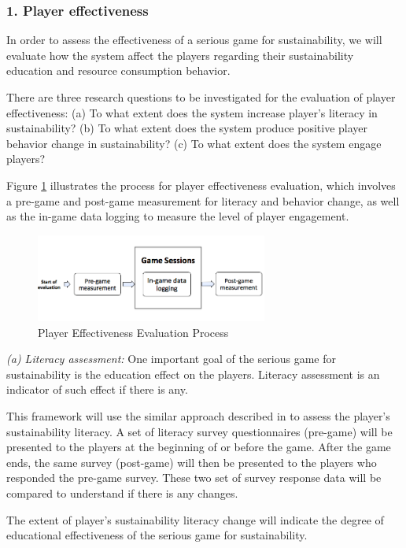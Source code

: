 \documentclass{sigchi}
\begin{document}
\subsubsection{1. Player effectiveness}
In order to assess the effectiveness of a serious game for sustainability, we will evaluate how the system affect the players regarding their sustainability education and resource consumption behavior.

There are three research questions to be investigated for the evaluation of player effectiveness: (a) To what extent does the system increase player's literacy in sustainability? (b) To what extent does the system produce positive player behavior change in sustainability? (c) To what extent does the system engage players?

Figure \ref{fig:pre-post-eval} illustrates the process for player effectiveness evaluation, which involves a pre-game and post-game measurement for literacy and behavior change, as well as the in-game data logging to measure the level of player engagement.

\begin{figure}
  \center
  \includegraphics[width=3in]{pre-post-eval}
  \caption{Player Effectiveness Evaluation Process}
  \label{fig:pre-post-eval}
\end{figure}

\emph {(a) Literacy assessment:}
One important goal of the serious game for sustainability is the education effect on the players. Literacy assessment is an indicator of such effect if there is any.

This framework will use the similar approach described in \cite{csdl2-10-08} to assess the player's sustainability literacy. A set of literacy survey questionnaires (pre-game) will be presented to the players at the beginning of or before the game. After the game ends, the same survey (post-game) will then be presented to the players who responded the pre-game survey. These two set of survey response data will be compared to understand if there is any changes.

The extent of player's sustainability literacy change will indicate the degree of educational effectiveness of the serious game for sustainability.
\end{document}
